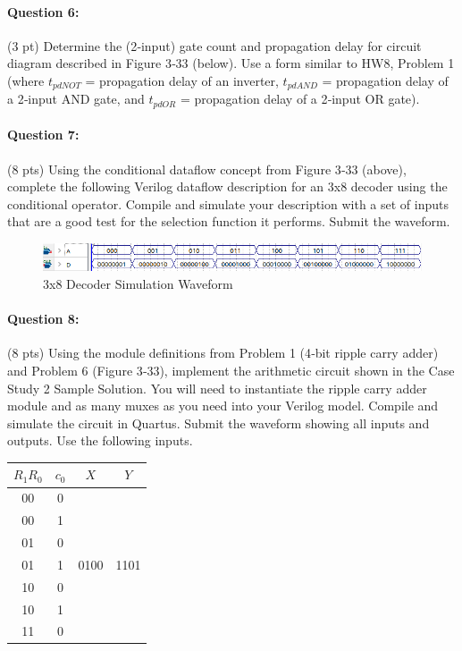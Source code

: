 \documentclass[12pt,letterpaper,titlepage]{report}
\begin{document}
\begin{raggedright}
\paragraph{Question 6:}
(3 pt) Determine the (2‐input) gate count and propagation delay for circuit diagram described in Figure 3‐33 (below). Use a form similar to HW8, Problem 1 (where $t_{pdNOT}$ = propagation delay of an inverter, $t_{pdAND}$ = propagation delay of a 2‐input AND gate, and $t_{pdOR}$ = propagation delay of a 2‐input OR gate).



\clearpage
\paragraph{Question 7:}
(8 pts) Using the conditional dataflow concept from Figure 3‐33 (above), complete the following Verilog dataflow description for an 3x8 decoder using the conditional operator. Compile and simulate your description with a set of inputs that are a good test for the selection function it performs. Submit the waveform.

\begin{figure}[ht]
\centering
\includegraphics[width=\textwidth, height=\textheight, keepaspectratio=true]{hw9p7}
\caption{3x8 Decoder Simulation Waveform}
\end{figure}

\clearpage
\paragraph{Question 8:}
(8 pts) Using the module definitions from Problem 1 (4‐bit ripple carry adder) and Problem 6 (Figure 3‐33), implement the arithmetic circuit shown in the Case Study 2 Sample Solution. You will need to instantiate the ripple carry adder module and as many muxes as you need into your Verilog model. Compile and simulate the circuit in Quartus. Submit the waveform showing all inputs and outputs. Use the following inputs.
\begin{center}
\begin{tabular}{|c|c|c|c|}
\hline 
$R_1R_0$ & $c_0$ & $X$ & $Y$ \\ \hline 
00 & 0 & \multirow{7}{*}{0100} & \multirow{7}{*}{1101} \\  
00 & 1 &  &  \\  
01 & 0 &  &  \\  
01 & 1 &  &  \\  
10 & 0 &  &  \\  
10 & 1 &  &  \\  
11 & 0 &  &  \\ \hline 
\end{tabular} 


\end{center}
\end{raggedright}
\end{document}
